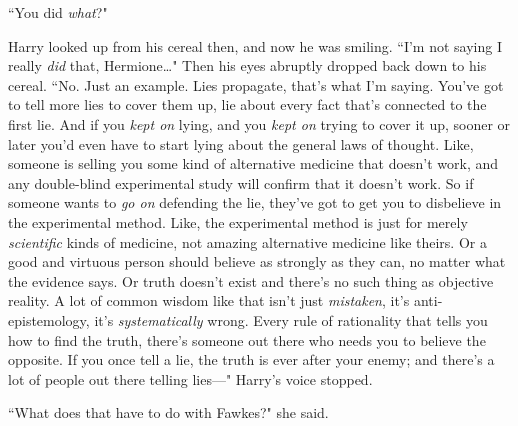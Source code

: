 ``You did \emph{what}?"

Harry looked up from his cereal then, and now he was smiling. ``I'm not saying I really \emph{did} that, Hermione{\ldots}" Then his eyes abruptly dropped back down to his cereal. ``No. Just an example. Lies propagate, that's what I'm saying. You've got to tell more lies to cover them up, lie about every fact that's connected to the first lie. And if you \emph{kept on} lying, and you \emph{kept on} trying to cover it up, sooner or later you'd even have to start lying about the general laws of thought. Like, someone is selling you some kind of alternative medicine that doesn't work, and any double-blind experimental study will confirm that it doesn't work. So if someone wants to \emph{go on} defending the lie, they've got to get you to disbelieve in the experimental method. Like, the experimental method is just for merely \emph{scientific} kinds of medicine, not amazing alternative medicine like theirs. Or a good and virtuous person should believe as strongly as they can, no matter what the evidence says. Or truth doesn't exist and there's no such thing as objective reality. A lot of common wisdom like that isn't just \emph{mistaken}, it's anti-epistemology, it's \emph{systematically} wrong. Every rule of rationality that tells you how to find the truth, there's someone out there who needs you to believe the opposite. If you once tell a lie, the truth is ever after your enemy; and there's a lot of people out there telling lies—" Harry's voice stopped.

``What does that have to do with Fawkes?" she said.

